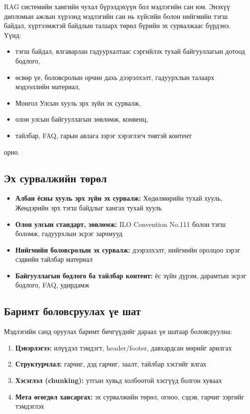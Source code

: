 RAG системийн хамгийн чухал бүрэлдэхүүн бол мэдлэгийн сан юм. Энэхүү дипломын ажлын хүрээнд мэдлэгийн сан нь хүйсийн болон нийгмийн тэгш байдал, хүртээмжтэй байдлын талаарх төрөл бүрийн эх сурвалжаас бүрдэнэ. Үүнд:
\begin{itemize}
    \item тэгш байдал, ялгаварлан гадуурхалтаас сэргийлэх тухай байгууллагын дотоод бодлого,
    \item өсвөр үе, боловсролын орчин дахь дээрэлхэлт, гадуурхлын талаарх мэдээллийн материал,
    \item Монгол Улсын хууль эрх зүйн эх сурвалж,
    \item олон улсын байгууллагын зөвлөмж, конвенц,
    \item тайлбар, FAQ, гарын авлага зэрэг хэрэглэгч төвтэй контент
\end{itemize}
орно.

\subsection{Эх сурвалжийн төрөл}

\begin{itemize}
    \item \textbf{Албан ёсны хууль эрх зүйн эх сурвалж:} Хөдөлмөрийн тухай хууль, Жендэрийн эрх тэгш байдлыг хангах тухай хууль \cite{mn_labor_law, mn_gender_law}
    \item \textbf{Олон улсын стандарт, зөвлөмж:} ILO Convention No.111 болон тэгш боломж, гадуурхлын эсрэг зарчмууд \cite{ilo_c111}
    \item \textbf{Нийгмийн боловсролын эх сурвалж:} дээрэлхэлт, нийгмийн оролцоо зэрэг сэдвийн тайлбар материал \cite{school_bullying_unesco, gender_equality_general, social_inclusion_general}
    \item \textbf{Байгууллагын бодлого ба тайлбар контент:} ёс зүйн дүрэм, дарамтын эсрэг бодлого, FAQ, удирдамж
\end{itemize}

\subsection{Баримт боловсруулах үе шат}

Мэдлэгийн санд оруулах баримт бичгүүдийг дараах үе шатаар боловсруулна:
\begin{enumerate}
    \item \textbf{Цэвэрлэгээ:} илүүдэл тэмдэгт, header/footer, давхардсан мөрийг арилгах
    \item \textbf{Структурчлал:} гарчиг, дэд гарчиг, заалт, тайлбар хэсгийг ялгах
    \item \textbf{Хэсэглэл (chunking):} утгын хувьд холбоотой хэсгүүд болгон хуваах
    \item \textbf{Мета өгөгдөл хавсаргах:} эх сурвалжийн төрөл, огноо, сэдэв, гарчиг зэргийг тэмдэглэх
\end{enumerate}

